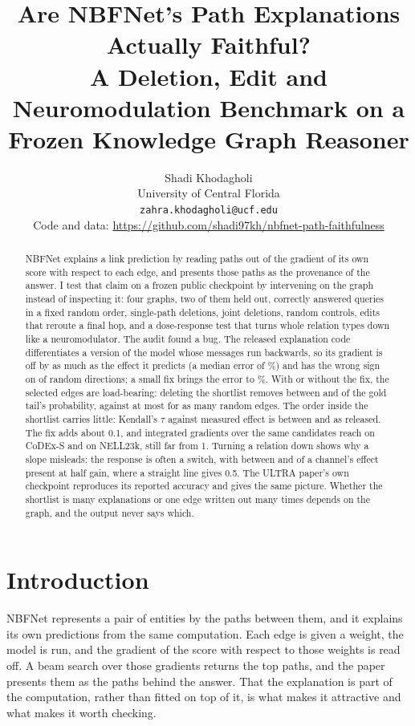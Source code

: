 \documentclass[10pt,twocolumn,letterpaper]{article}
\title{Are NBFNet's Path Explanations Actually Faithful?\\
A Deletion, Edit and Neuromodulation Benchmark on a Frozen Knowledge Graph Reasoner}
\author{Shadi Khodagholi\\
University of Central Florida\\
{\tt\small zahra.khodagholi@ucf.edu}\\
{\small Code and data: \url{https://github.com/shadi97kh/nbfnet-path-faithfulness}}
}
\begin{document}
\maketitle

\begin{abstract}
\noindent
NBFNet explains a link prediction by reading paths out of the gradient of its
own score with respect to each edge, and presents those paths as the
provenance of the answer. I test that claim on a frozen public checkpoint by
intervening on the graph instead of inspecting it: four graphs, two of them
held out, \allQueries{} correctly answered queries in a fixed random order,
\allDeletions{} single-path deletions, joint deletions, random controls, edits
that reroute a final hop, and a dose-response test that turns whole relation
types down like a neuromodulator. The audit found a bug. The released
explanation code differentiates a version of the model whose messages run
backwards, so its gradient is off by as much as the effect it predicts (a
median error of \allDirErrReleased\%) and has the wrong sign on
\allDirSignReleased{} of \allDirN{} random directions; a small fix brings the
error to \allDirErrCorrected\%. With or without the fix, the selected edges are
load-bearing: deleting the shortlist removes between \allCompFracOfBaseMin{}
and \allCompFracOfBaseMax{} of the gold tail's probability, against at most
\allCompRandomFracOfBaseMax{} for as many random edges. The order inside the
shortlist carries little: Kendall's \(\tau\) against measured effect is
between \allKendallTauGradVsDropMin{} and \allKendallTauGradVsDropMax{} as
released. The fix adds about 0.1, and integrated gradients over the same
candidates reach \cxIgTau{} on CoDEx-S and \nlIgTau{} on NELL23k, still far
from 1. Turning a relation down shows why a slope misleads: the response is
often a switch, with between \allNmHalfDoseMin{} and \allNmHalfDoseMax{} of a
channel's effect present at half gain, where a straight line gives 0.5. The
ULTRA paper's own checkpoint reproduces its reported accuracy and gives the
same picture. Whether the shortlist is many explanations or one edge written
out many times depends on the graph, and the output never says which.
\end{abstract}

\section{Introduction}

NBFNet \cite{nbfnet} represents a pair of entities by the paths between them,
and it explains its own predictions from the same computation. Each edge is
given a weight, the model is run, and the gradient of the score with respect
to those weights is read off. A beam search over those gradients returns the
top paths, and the paper presents them as the paths behind the answer. That
the explanation is part of the computation, rather than fitted on top of it,
is what makes it attractive and what makes it worth checking.
\end{document}
